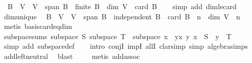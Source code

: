 \begin{isabellebody}
\ \ {\isachardoublequoteopen}B\ {\isasymsubseteq}\ V\ {\isasymLongrightarrow}\ V\ {\isasymsubseteq}\ span\ B\ {\isasymLongrightarrow}\ finite\ B\ {\isasymLongrightarrow}\ dim\ V\ {\isasymle}\ card\ B{\isachardoublequoteclose}\isanewline
%
\isadelimproof
\ \ %
\endisadelimproof
%
\isatagproof
{}\isamarkupfalse%
\ {\isacharparenleft}{\kern0pt}simp\ add{\isacharcolon}{\kern0pt}\ dim{\isacharunderscore}{\kern0pt}le{\isacharunderscore}{\kern0pt}card{\isacharparenright}{\kern0pt}%
\endisatagproof
{\isafoldproof}%
%
\isadelimproof
\isanewline
%
\endisadelimproof
\isanewline
{}\isamarkupfalse%
\ dim{\isacharunderscore}{\kern0pt}unique{\isacharcolon}{\kern0pt}\isanewline
\ \ {\isachardoublequoteopen}B\ {\isasymsubseteq}\ V\ {\isasymLongrightarrow}\ V\ {\isasymsubseteq}\ span\ B\ {\isasymLongrightarrow}\ independent\ B\ {\isasymLongrightarrow}\ card\ B\ {\isacharequal}{\kern0pt}\ n\ {\isasymLongrightarrow}\ dim\ V\ {\isacharequal}{\kern0pt}\ n{\isachardoublequoteclose}\isanewline
%
\isadelimproof
\ \ %
\endisadelimproof
%
\isatagproof
{}\isamarkupfalse%
\ {\isacharparenleft}{\kern0pt}metis\ basis{\isacharunderscore}{\kern0pt}card{\isacharunderscore}{\kern0pt}eq{\isacharunderscore}{\kern0pt}dim{\isacharparenright}{\kern0pt}%
\endisatagproof
{\isafoldproof}%
%
\isadelimproof
\isanewline
%
\endisadelimproof
\isanewline
{}\isamarkupfalse%
\ subspace{\isacharunderscore}{\kern0pt}sums{\isacharcolon}{\kern0pt}\ {\isachardoublequoteopen}{\isasymlbrakk}subspace\ S{\isacharsemicolon}{\kern0pt}\ subspace\ T{\isasymrbrakk}\ {\isasymLongrightarrow}\ subspace\ {\isacharbraceleft}{\kern0pt}x\ {\isacharplus}{\kern0pt}\ y{\isacharbar}{\kern0pt}x\ y{\isachardot}{\kern0pt}\ x\ {\isasymin}\ S\ {\isasymand}\ y\ {\isasymin}\ T{\isacharbraceright}{\kern0pt}{\isachardoublequoteclose}\isanewline
%
\isadelimproof
\ \ %
\endisadelimproof
%
\isatagproof
{}\isamarkupfalse%
\ {\isacharparenleft}{\kern0pt}simp\ add{\isacharcolon}{\kern0pt}\ subspace{\isacharunderscore}{\kern0pt}def{\isacharparenright}{\kern0pt}\isanewline
\ \ \isamarkupfalse%
\ {\isacharparenleft}{\kern0pt}intro\ conjI\ impI\ allI{\isacharsemicolon}{\kern0pt}\ clarsimp\ simp{\isacharcolon}{\kern0pt}\ algebra{\isacharunderscore}{\kern0pt}simps{\isacharparenright}{\kern0pt}\isanewline
\ \ \isamarkupfalse%
\ add{\isachardot}{\kern0pt}left{\isacharunderscore}{\kern0pt}neutral\ \isamarkupfalse%
\ blast\isanewline
\ \ \ \isamarkupfalse%
\ {\isacharparenleft}{\kern0pt}metis\ add{\isachardot}{\kern0pt}assoc{\isacharparenright}{\kern0pt}\isanewline

\end{isabellebody}
